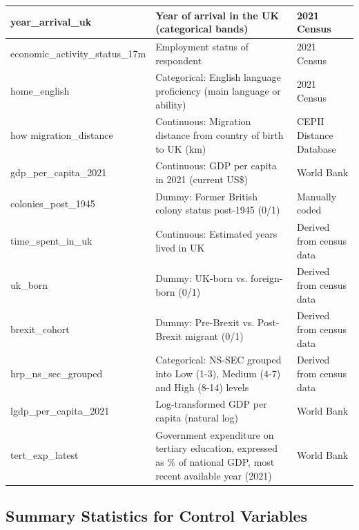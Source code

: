 \documentclass[12pt, a4paper]{article}
\begin{document}
\begin{table}[H]
\begin{tabular}{|p{5cm}|p{8cm}|p{3cm}|}
\hline
year\_arrival\_uk & Year of arrival in the UK (categorical bands) & 2021 Census \\
\hline
economic\_activity\_status\_17m & Employment status of respondent & 2021 Census \\
\hline
home\_english & Categorical: English language proficiency (main language or ability) & 2021 Census \\
\hline
how migration\_distance & Continuous: Migration distance from country of birth to UK (km) & CEPII Distance Database \\
\hline
gdp\_per\_capita\_2021 & Continuous: GDP per capita in 2021 (current US\$) & World Bank \\
\hline
colonies\_post\_1945 & Dummy: Former British colony status post-1945 (0/1) & Manually coded \\
\hline
time\_spent\_in\_uk & Continuous: Estimated years lived in UK & Derived from census data \\
\hline
uk\_born & Dummy: UK-born vs. foreign-born (0/1) & Derived from census data \\
\hline
brexit\_cohort & Dummy: Pre-Brexit vs. Post-Brexit migrant (0/1) & Derived from census data \\
\hline
hrp\_ns\_sec\_grouped & Categorical: NS-SEC grouped into Low (1-3), Medium (4-7) and High (8-14) levels & Derived from census data \\
\hline
lgdp\_per\_capita\_2021 & Log-transformed GDP per capita (natural log) & World Bank \\
\hline
{tert\_exp\_latest} & Government expenditure on tertiary education, expressed as \% of national GDP, most recent available year (2021) & World Bank \\
\hline
\end{tabular}

\end{table}

\subsection {Summary Statistics for Control Variables} \label{tab: sum stat}
\end{document}
